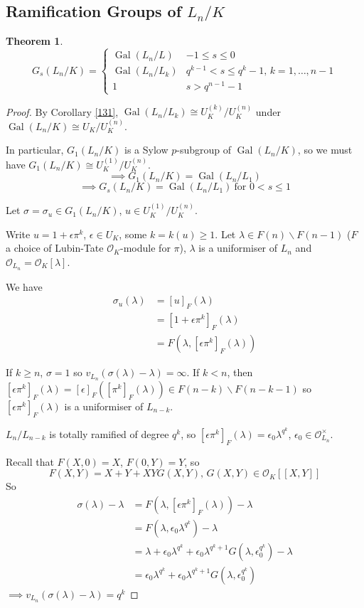 \documentclass[a4paper]{article}
\theoremstyle{definition}
\theoremstyle{default}
\newtheorem{theorem}[definition]{Theorem}
\theoremstyle{remark}
\DeclareMathOperator{\Gal}{Gal}
\begin{document}
\subsection{Ramification Groups of $L_n/K$}
\begin{theorem}
	$$G_s(L_n/K) = \begin{cases}
		\Gal(L_n/L) & -1 \leq s \leq 0 \\
		\Gal(L_n/L_k) & q^{k-1}  < s\leq q^k-1,\, k=1, \dots, n-1 \\
		1 & s>q^{n-1}-1
	\end{cases}$$
\end{theorem}
\begin{proof}
	By Corollary \ref{131}, $\Gal(L_n/L_k) \cong U_K^{(k)}/U_K^{(n)}$
	under $\Gal(L_n/K) \cong U_K/U_K^{(n)}$.
	
	In particular, $G_1(L_n/K)$ is a Sylow $p$-subgroup of $\Gal(L_n/K)$,
	so we must have $G_1(L_n/K) \cong U_K^{(1)}/U_K^{(n)}$.
	$$\implies G_1(L_n/K) = \Gal(L_n/L_1)$$
	$$\implies G_s(L_n/K) = \Gal(L_n/L_1)\ \text{for } 0< s \leq 1$$
	
	Let $\sigma = \sigma_u \in G_1(L_n/K)$, $u \in U_K^{(1)}/U_K^{(n)}$.
	
	Write $u=1+\epsilon \pi^k$, $\epsilon \in U_K$,
	some $k=k(u) \geq 1$.
	Let $\lambda \in F(n) \backslash F(n-1)$
	($F$ a choice of Lubin-Tate $\mathcal{O}_K$-module for $\pi$),
	$\lambda$ is a uniformiser of $L_n$ and $\mathcal{O}_{L_n} = \mathcal{O}_K[\lambda]$.
	
	We have
	\begin{align*}
		\sigma_u(\lambda) &= [u]_F(\lambda) \\
		&= [1+\epsilon \pi^k]_F(\lambda) \\
		&= F(\lambda, [\epsilon \pi^k]_F(\lambda))
	\end{align*}
	
	If $k \geq n$, $\sigma=1$ so $v_{L_n}(\sigma(\lambda)-\lambda) = \infty$.
	If $k<n$, then $[\epsilon \pi^k]_F(\lambda) = [\epsilon]_F([\pi^k]_F(\lambda)) \in F(n-k)\backslash F(n-k-1)$
	so $[\epsilon \pi^k]_F(\lambda)$ is a uniformiser of $L_{n-k}$.
	
	$L_n/L_{n-k}$ is totally ramified of degree $q^k$,
	so $[\epsilon \pi^k]_F(\lambda) = \epsilon_0 \lambda^{q^k}$,
	$\epsilon_0 \in \mathcal{O}_{L_n}^\times$.
	
	Recall that $F(X,0)=X$, $F(0, Y)=Y$, so
	$$F(X, Y) = X+Y+XYG(X,Y),\, G(X,Y) \in \mathcal{O}_K[[X, Y]]$$
	So
	\begin{align*}
		\sigma(\lambda)-\lambda &= F(\lambda, [\epsilon\pi^k]_F(\lambda))-\lambda \\
		&= F(\lambda, \epsilon_0\lambda^{q^k}) - \lambda \\
		&= \lambda + \epsilon_0 \lambda^{q^k} + \epsilon_0 \lambda^{q^k+1}G(\lambda, \epsilon_0^{q^k}) - \lambda \\
		&= \epsilon_0\lambda^{q^k}+\epsilon_0\lambda^{q^k+1}G(\lambda, \epsilon_0^{q^k})
	\end{align*}
	$\implies v_{L_n}(\sigma(\lambda)-\lambda) = q^k$
	

\end{proof}
\end{document}

